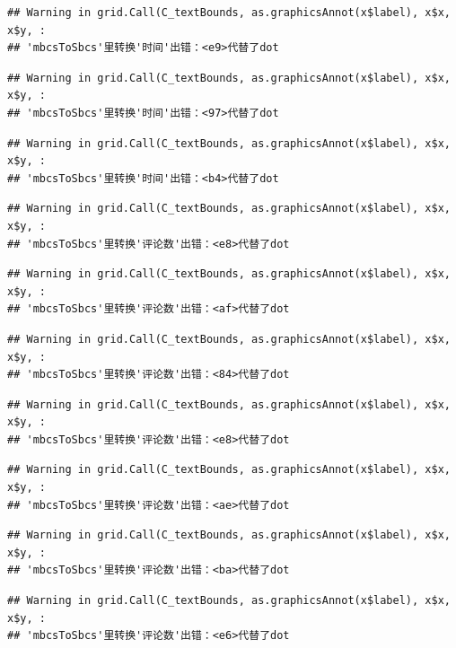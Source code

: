 \documentclass[
]{article}
\begin{document}
\begin{verbatim}
## Warning in grid.Call(C_textBounds, as.graphicsAnnot(x$label), x$x, x$y, :
## 'mbcsToSbcs'里转换'时间'出错：<e9>代替了dot
\end{verbatim}

\begin{verbatim}
## Warning in grid.Call(C_textBounds, as.graphicsAnnot(x$label), x$x, x$y, :
## 'mbcsToSbcs'里转换'时间'出错：<97>代替了dot
\end{verbatim}

\begin{verbatim}
## Warning in grid.Call(C_textBounds, as.graphicsAnnot(x$label), x$x, x$y, :
## 'mbcsToSbcs'里转换'时间'出错：<b4>代替了dot
\end{verbatim}

\begin{verbatim}
## Warning in grid.Call(C_textBounds, as.graphicsAnnot(x$label), x$x, x$y, :
## 'mbcsToSbcs'里转换'评论数'出错：<e8>代替了dot
\end{verbatim}

\begin{verbatim}
## Warning in grid.Call(C_textBounds, as.graphicsAnnot(x$label), x$x, x$y, :
## 'mbcsToSbcs'里转换'评论数'出错：<af>代替了dot
\end{verbatim}

\begin{verbatim}
## Warning in grid.Call(C_textBounds, as.graphicsAnnot(x$label), x$x, x$y, :
## 'mbcsToSbcs'里转换'评论数'出错：<84>代替了dot
\end{verbatim}

\begin{verbatim}
## Warning in grid.Call(C_textBounds, as.graphicsAnnot(x$label), x$x, x$y, :
## 'mbcsToSbcs'里转换'评论数'出错：<e8>代替了dot
\end{verbatim}

\begin{verbatim}
## Warning in grid.Call(C_textBounds, as.graphicsAnnot(x$label), x$x, x$y, :
## 'mbcsToSbcs'里转换'评论数'出错：<ae>代替了dot
\end{verbatim}

\begin{verbatim}
## Warning in grid.Call(C_textBounds, as.graphicsAnnot(x$label), x$x, x$y, :
## 'mbcsToSbcs'里转换'评论数'出错：<ba>代替了dot
\end{verbatim}

\begin{verbatim}
## Warning in grid.Call(C_textBounds, as.graphicsAnnot(x$label), x$x, x$y, :
## 'mbcsToSbcs'里转换'评论数'出错：<e6>代替了dot
\end{verbatim}
\end{document}
